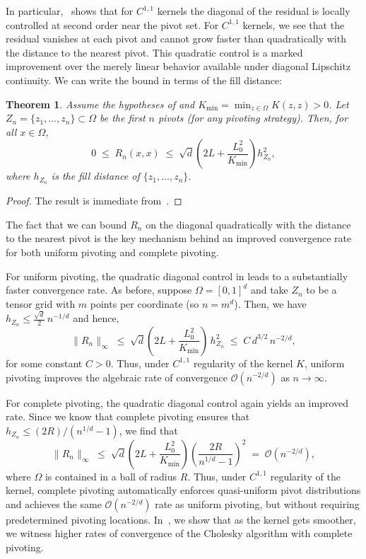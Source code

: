 \documentclass{amsart}
\newtheorem{theorem}{Theorem}[section]
\theoremstyle{definition}
\theoremstyle{remark}
\begin{document}
In particular,~ shows that for $C^{1,1}$ kernels the diagonal of the residual is locally controlled at second order near the pivot set. For $C^{1,1}$ kernels, we see that the residual vanishes at each pivot and cannot grow faster than quadratically with the distance to the nearest pivot. 
This quadratic control is a marked improvement over the merely linear behavior available under diagonal Lipschitz continuity. We can write the bound in terms of the fill distance: 
\begin{theorem}\label{thm:filldistance-squared}
Assume the hypotheses of  and $K_{\min} = \min_{z\in\Omega} K(z,z)>0$. Let $Z_n=\{z_1,\dots,z_n\}\subset\Omega$ be the first $n$ pivots (for any pivoting strategy). Then, for all $x\in\Omega$,
\[
0\;\le\; R_n(x,x)\;\le\; \sqrt{d}\left(2L + \frac{L_0^2}{K_{\min}}\right) h^2_{Z_n},
\]
where $h_{Z_n}$ is the fill distance of $\{z_1,\dots,z_n\}$. 
\end{theorem}
\begin{proof}
The result is immediate from~. 
\end{proof} 

The fact that we can bound $R_n$ on the diagonal quadratically with the distance to the nearest pivot is the key mechanism behind an improved convergence rate for both uniform pivoting and complete pivoting. 

For uniform pivoting, the quadratic diagonal control in  leads to a substantially faster convergence rate. 
As before, suppose $\Omega=[0,1]^d$ and take $Z_n$ to be a tensor grid with $m$ points per coordinate (so $n=m^d$). Then, we have $h_{Z_n}\leq \frac{\sqrt d}{2}\,n^{-1/d}$ and hence,
\[
\|R_n\|_{\infty}\;\le\;\sqrt{d}\!\left(2L+\frac{L_0^2}{K_{\min}}\right)\,h_{Z_n}^2
\;\le\;C\,d^{3/2}\,n^{-2/d},
\]
for some constant $C>0$. Thus, under $C^{1,1}$ regularity of the kernel $K$, uniform pivoting improves the algebraic rate of convergence $\mathcal{O}(n^{-2/d})$ as $n\rightarrow \infty$.

For complete pivoting, the quadratic diagonal control again yields an improved rate. Since we know that complete pivoting ensures that $h_{Z_n} \leq (2R)/(n^{1/d} - 1)$, we find that 
\[
\|R_n\|_{\infty}\;\le\;\sqrt{d}\left(2L + \frac{L_0^2}{K_{\min}}\right) \left(\frac{2R}{n^{1/d} - 1}\right)^2\;=\;\mathcal{O}(n^{-2/d}),
\]
where $\Omega$ is contained in a ball of radius $R$. Thus, under $C^{1,1}$ regularity of the kernel, complete pivoting automatically enforces quasi-uniform pivot distributions and achieves the same $\mathcal{O}(n^{-2/d})$ rate as uniform pivoting, but without requiring predetermined pivoting locations. In~, we show that as the kernel gets smoother, we witness higher rates of convergence of the Cholesky algorithm with complete pivoting. 
\end{document}
